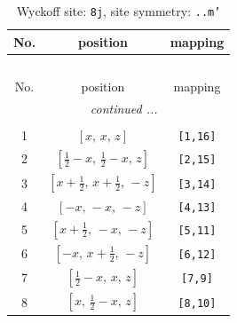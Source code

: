 \documentclass[fleqn,8pt]{jsarticle}
\begin{document}
\begin{longtable}{ccc}
\caption{Wyckoff site: {\tt 8j}, site symmetry: {\tt ..m'}}
 \\
 \hline \hline
No. & position & mapping \\ \hline \endfirsthead

\multicolumn{2}{l}{\tablename\ \thetable{}} \\
 \hline \hline
No. & position & mapping \\ \hline \endhead

 \hline \hline
\multicolumn{2}{r}{\footnotesize\it continued ...} \\ \endfoot

 \hline \hline
\multicolumn{2}{r}{} \\ \endlastfoot

1 & $\left[ x,\, x,\, z \right]$ & {\tt [1,16]} \\ \hline
2 & $\left[ \frac{1}{2} - x,\, \frac{1}{2} - x,\, z \right]$ & {\tt [2,15]} \\ \hline
3 & $\left[ x + \frac{1}{2},\, x + \frac{1}{2},\, - z \right]$ & {\tt [3,14]} \\ \hline
4 & $\left[ - x,\, - x,\, - z \right]$ & {\tt [4,13]} \\ \hline
5 & $\left[ x + \frac{1}{2},\, - x,\, - z \right]$ & {\tt [5,11]} \\ \hline
6 & $\left[ - x,\, x + \frac{1}{2},\, - z \right]$ & {\tt [6,12]} \\ \hline
7 & $\left[ \frac{1}{2} - x,\, x,\, z \right]$ & {\tt [7,9]} \\ \hline
8 & $\left[ x,\, \frac{1}{2} - x,\, z \right]$ & {\tt [8,10]} \\
\end{longtable}
\renewcommand{\arraystretch}{1.2}
\end{document}
